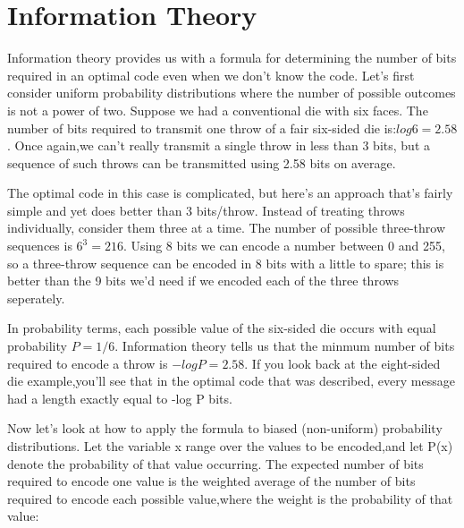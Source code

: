 \documentclass[a4]{beamer}
\begin{document}
\section{Information Theory}
\begin{frame}
Information theory provides us with a formula for determining the number of bits required in an optimal code even when we don't know the code. Let's first consider uniform probability distributions where the number of possible outcomes is not a power of two. Suppose we had a conventional die with six faces. The number of bits required to transmit one throw of a fair six-sided die is:$ log 6 = 2.58$. Once again,we can't really transmit a single throw in less than 3 bits, but a sequence of such throws can be transmitted using 2.58 bits on average. 
\end{frame}
\begin{frame}
\large
The optimal code in this case is complicated, but here's an approach that's fairly simple and yet does better than 3 bits/throw. Instead of treating throws individually, consider them three at a time. The number of possible three-throw sequences is $6^3= 216$. Using 8 bits we can encode a number between 0 and 255, so a three-throw sequence can be encoded in 8 bits with a little to spare; this is better than the 9 bits we'd need if we encoded each of the three throws seperately.
\end{frame}
\begin{frame}
\large
In probability terms, each possible value of the six-sided die occurs with equal probability $P=1/6$. Information theory tells us that the minmum number of bits required to encode a throw is $-log P = 2.58$. If you look back at the eight-sided die example,you'll see that in the optimal code that was described, every message had a length exactly equal to -log P bits.
\end{frame}
\begin{frame}
\large Now let's look at how to apply the formula to biased (non-uniform) probability distributions. Let the variable x range over the values to be encoded,and let P(x) denote the probability of that value occurring. The expected number of bits required to encode one value is the weighted average of the number of bits required to encode each possible value,where the weight is the probability of that value: 
\end{frame}
\end{document}
